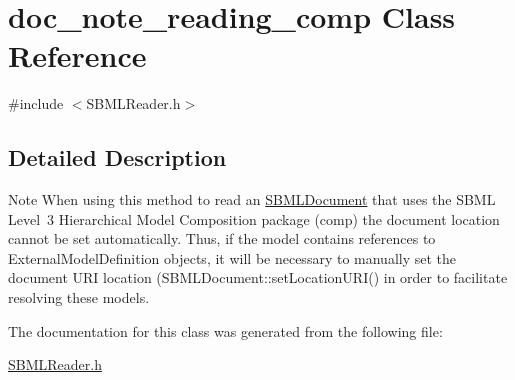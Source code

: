 \hypertarget{classdoc__note__reading__comp}{}\section{doc\+\_\+note\+\_\+reading\+\_\+comp Class Reference}
\label{classdoc__note__reading__comp}


{\ttfamily \#include $<$S\+B\+M\+L\+Reader.\+h$>$}



\subsection{Detailed Description}
\begin{DoxyNote}{Note}
When using this method to read an \hyperlink{class_s_b_m_l_document}{S\+B\+M\+L\+Document} that uses the S\+B\+ML Level~3 Hierarchical Model Composition package (comp) the document location cannot be set automatically. Thus, if the model contains references to External\+Model\+Definition objects, it will be necessary to manually set the document U\+RI location (S\+B\+M\+L\+Document\+::set\+Location\+U\+R\+I() in order to facilitate resolving these models. 
\end{DoxyNote}


The documentation for this class was generated from the following file\+:\begin{DoxyCompactItemize}
\item 
\hyperlink{_s_b_m_l_reader_8h}{S\+B\+M\+L\+Reader.\+h}\end{DoxyCompactItemize}
